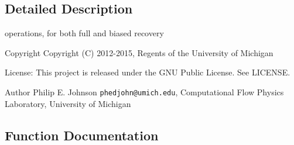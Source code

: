 \subsection{Detailed Description}
operations, for both full and biased recovery \begin{DoxyCopyright}{Copyright}
Copyright (C) 2012-\/2015, Regents of the University of Michigan 
\end{DoxyCopyright}
\begin{DoxyParagraph}{License\-:}
This project is released under the G\-N\-U Public License. See L\-I\-C\-E\-N\-S\-E. 
\end{DoxyParagraph}
\begin{DoxyAuthor}{Author}
Philip E. Johnson {\tt phedjohn@umich.\-edu}, Computational Flow Physics Laboratory, University of Michigan 
\end{DoxyAuthor}


\subsection{Function Documentation}
